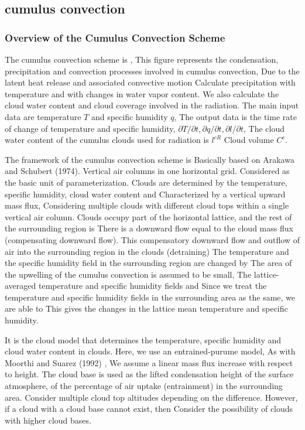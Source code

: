 \hypertarget{cumulus-convection}{%
\subsection{cumulus convection}\label{cumulus-convection}}

\hypertarget{overview-of-the-cumulus-convection-scheme}{%
\subsubsection{Overview of the Cumulus Convection
Scheme}\label{overview-of-the-cumulus-convection-scheme}}

The cumulus convection scheme is , This figure represents the
condensation, precipitation and convection processes involved in cumulus
convection, Due to the latent heat release and associated convective
motion Calculate precipitation with temperature and with changes in
water vapor content. We also calculate the cloud water content and cloud
coverage involved in the radiation. The main input data are temperature
\(T\) and specific humidity \(q\), The output data is the time rate of
change of temperature and specific humidity,
\(\partial T/\partial t, \partial q/\partial t, \partial l/\partial t\),
The cloud water content of the cumulus clouds used for radiation is
\(l^{cR}\) Cloud volume \(C^c\).

The framework of the cumulus convection scheme is Basically based on
Arakawa and Schubert (1974). Vertical air columns in one horizontal
grid. Considered as the basic unit of parameterization. Clouds are
determined by the temperature, specific humidity, cloud water content
and Characterized by a vertical upward mass flux, Considering multiple
clouds with different cloud tops within a single vertical air column.
Clouds occupy part of the horizontal lattice, and the rest of the
surrounding region is There is a downward flow equal to the cloud mass
flux (compensating downward flow). This compensatory downward flow and
outflow of air into the surrounding region in the clouds (detraining)
The temperature and the specific humidity field in the surrounding
region are changed by The area of the upwelling of the cumulus
convection is assumed to be small, The lattice-averaged temperature and
specific humidity fields and Since we treat the temperature and specific
humidity fields in the surrounding area as the same, we are able to This
gives the changes in the lattice mean temperature and specific humidity.

It is the cloud model that determines the temperature, specific humidity
and cloud water content in clouds. Here, we use an entrained-purume
model, As with Moorthi and Suarez (1992) , We assume a linear mass flux
increase with respect to height. The cloud base is used as the lifted
condensation height of the surface atmosphere, of the percentage of air
uptake (entrainment) in the surrounding area. Consider multiple cloud
top altitudes depending on the difference. However, if a cloud with a
cloud base cannot exist, then Consider the possibility of clouds with
higher cloud bases.

